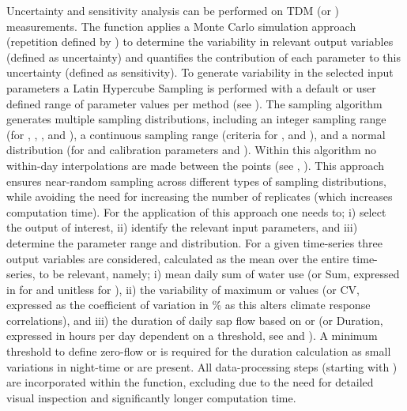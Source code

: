 \documentclass[a4paper]{book}
\begin{document}
\begin{Details}\relax
Uncertainty and sensitivity analysis can be performed on TDM  (or ) measurements.
The function applies a Monte Carlo simulation approach (repetition defined by )
to determine the variability in relevant output variables (defined as uncertainty)
and quantifies the contribution of each parameter to this uncertainty (defined as sensitivity).
To generate variability in the selected input parameters a Latin Hypercube Sampling is performed with a default
or user defined range of parameter values per  method (see ).
The sampling algorithm generates multiple sampling distributions, including an integer sampling range (for ,
, , and ), a continuous sampling range (criteria for ,  and ),
and a normal distribution (for  and calibration parameters  and ).
Within this algorithm no within-day interpolations are made between the  points
(see , ). This approach ensures near-random sampling across different
types of sampling distributions, while avoiding the need for increasing the number of replicates
(which increases computation time). For the application of this approach one needs to;
i) select the output of interest,
ii) identify the relevant input parameters, and
iii) determine the parameter range and distribution.
For a given time-series three output variables are considered, calculated as the mean over the entire time-series,
to be relevant, namely;
i) mean daily sum of water use (or Sum, expressed in  for  and unitless for ),
ii) the variability of maximum  or  values (or CV, expressed as the coefficient of variation in \%
as this alters climate response correlations), and
iii) the duration of daily sap flow based on  or  (or Duration, expressed in hours per day dependent on a threshold,
see  and ).
A minimum threshold to define zero-flow  or  is required for the duration calculation
as small variations in night-time  or  are present. All data-processing steps
(starting with ) are incorporated within the function, excluding 
due to the need for detailed visual inspection and significantly longer computation time.


\end{Details}
\end{document}
